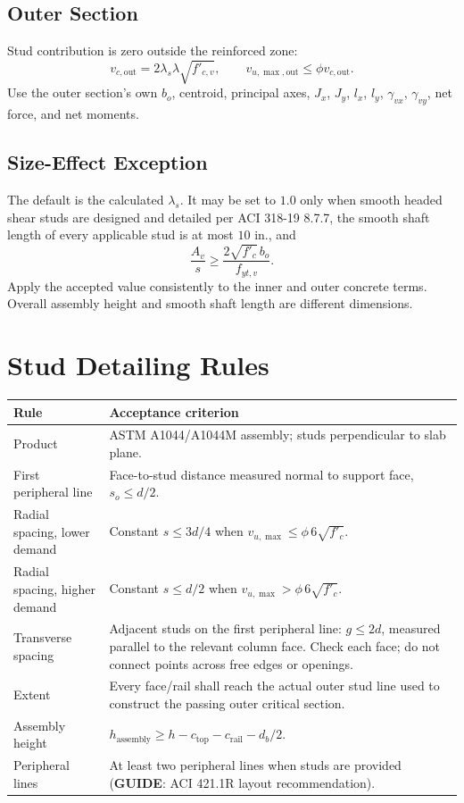 \documentclass[10pt]{article}
\newcommand{\guide}{\textbf{GUIDE}}
\begin{document}
\subsection{Outer Section}

Stud contribution is zero outside the reinforced zone:
\begin{equation}
v_{c,\mathrm{out}}=2\lambda_s\lambda\sqrt{f'_{c,v}},\qquad
\boxed{v_{u,\max,\mathrm{out}}\leq\phi v_{c,\mathrm{out}}}.
\end{equation}
Use the outer section's own $b_o$, centroid, principal axes, $J_x$, $J_y$,
$l_x$, $l_y$, $\gamma_{vx}$, $\gamma_{vy}$, net force, and net moments.

\subsection{Size-Effect Exception}

The default is the calculated $\lambda_s$. It may be set to $1.0$ only when
smooth headed shear studs are designed and detailed per ACI 318-19 8.7.7,
the smooth shaft length of every applicable stud is at most $10$ in., and
\begin{equation}
\frac{A_v}{s}\geq\frac{2\sqrt{f'_c}\,b_o}{f_{yt,v}}.
\end{equation}
Apply the accepted value consistently to the inner and outer concrete terms.
Overall assembly height and smooth shaft length are different dimensions.

\section{Stud Detailing Rules}

{\small
\begin{tabularx}{\linewidth}{@{}p{2.55in}X@{}}
\toprule
\textbf{Rule} & \textbf{Acceptance criterion} \\
\midrule
Product & ASTM A1044/A1044M assembly; studs perpendicular to slab plane. \\
First peripheral line & Face-to-stud distance measured normal to support face,
$s_o\leq d/2$. \\
Radial spacing, lower demand &
Constant $s\leq3d/4$ when
$v_{u,\max}\leq\phi\,6\sqrt{f'_c}$. \\
Radial spacing, higher demand &
Constant $s\leq d/2$ when
$v_{u,\max}>\phi\,6\sqrt{f'_c}$. \\
Transverse spacing & Adjacent studs on the first peripheral line:
$g\leq2d$, measured parallel to the relevant column face. Check each face;
do not connect points across free edges or openings. \\
Extent & Every face/rail shall reach the actual outer stud line used to
construct the passing outer critical section. \\
Assembly height &
$h_{\mathrm{assembly}}\geq h-c_{\mathrm{top}}-c_{\mathrm{rail}}-d_b/2$. \\
Peripheral lines & At least two peripheral lines when studs are provided
(\guide: ACI 421.1R layout recommendation). \\
\bottomrule
\end{tabularx}
}
\end{document}
